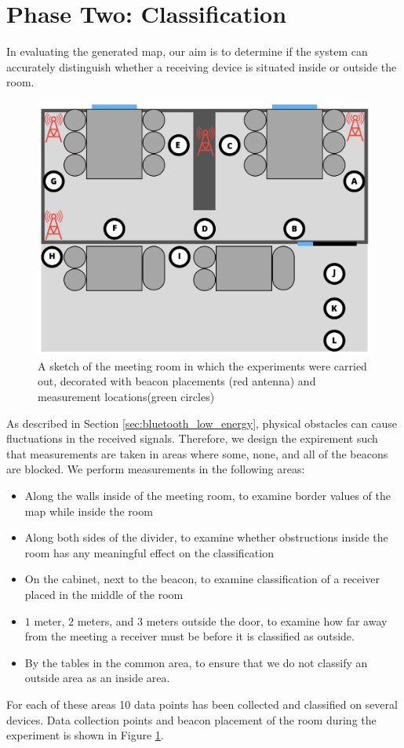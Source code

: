 \section{Phase Two: Classification} %
In evaluating the generated map, our aim is to determine if the system can accurately distinguish whether a receiving device is situated inside or outside the room.
\begin{figure}[h]
    \centering
    \includegraphics[scale=0.5]{images/experiment_setup.png}
    \caption{A sketch of the meeting room in which the experiments were carried out, decorated with beacon placements (red antenna) and measurement locations(green circles)}
    \label{fig:experiment_setup}
\end{figure}
As described in Section \ref{sec:bluetooth_low_energy}, physical obstacles can cause fluctuations in the received signals. 
Therefore, we design the expirement such that measurements are taken in areas where some, none, and all of the beacons are blocked. 
We perform measurements in the following areas:
\begin{itemize}
    \item Along the walls inside of the meeting room, to examine border values of the map while inside the room
    \item Along both sides of the divider, to examine whether obstructions inside the room has any meaningful effect on the classification
    \item On the cabinet, next to the beacon, to examine classification of a receiver placed in the middle of the room
    \item $1$ meter, $2$ meters, and $3$ meters outside the door, to examine how far away from the meeting a receiver must be before it is classified as outside.
    \item By the tables in the common area, to ensure that we do not classify an outside area as an inside area.
\end{itemize}
For each of these areas 10 data points has been collected and classified on several devices.
Data collection points and beacon placement of the room during the experiment is shown in Figure \ref{fig:experiment_setup}. 
